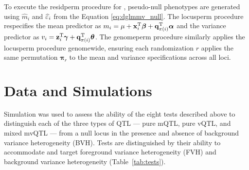     To execute the residperm procedure for \DGLMmv, pseudo-null phenotypes are generated using $\widehat{m}_i$ and $\widehat{\varepsilon}_i$ from the Equation \ref{eq:dglmmv_null}.
    The locusperm procedure respecifies the mean predictor as $m_i = \mu + \mathbf{x}_i^\mathrm{T}\bm{\beta} + \mathbf{q}_{\pi(i)}^\mathrm{T}\bm{\alpha}$ and the variance predictor as $v_i = \mathbf{z}_i^\mathrm{T}\bm{\gamma} + \mathbf{q}_{\pi(i)}^\mathrm{T}\bm{\theta}$.
    The genomeperm procedure similarly applies the locusperm procedure genomewide, ensuring each randomization $r$ applies the same permutation $\bm{\pi}_r$ to the mean and variance specifications across all loci.








\section{Data and Simulations}

Simulation was used to assess the ability of the eight tests described above to distinguish each of the three types of QTL --- pure mQTL, pure vQTL, and mixed mvQTL --- from a null locus in the presence and absence of background variance heterogeneity (BVH).
Tests are distinguished by their ability to accommodate and target foreground variance heterogeneity (FVH) and background variance heterogeneity (Table~\ref{tab:tests}).

